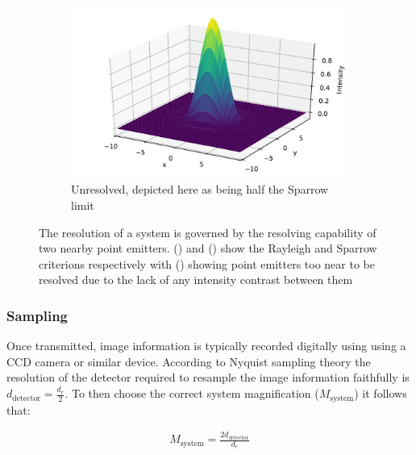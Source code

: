     \begin{figure}
    \ContinuedFloat
    \begin{subfigure}[b]{\textwidth}
        \includegraphics{+airy_too_close}
        \caption{Unresolved, depicted here as being half the Sparrow limit}
        \label{fig:airy_too_close}
    \end{subfigure}
    \caption{The resolution of a system is governed by the resolving capability of two nearby point emitters.
    () and () show the Rayleigh and Sparrow criterions respectively with () showing point emitters too near to be resolved due to the lack of any intensity contrast between them}
    \label{fig:airy_disk_resolution}
\end{figure}

%
%


\subsubsection{Sampling}

Once transmitted, image information is typically recorded digitally using using a CCD camera or similar device.
According to Nyquist sampling theory the resolution of the detector required to resample the image information faithfully is $d_\text{detector} = \frac{d_r}{2}$.
To then choose the correct system magnification ($M_\text{system}$) it follows that:

\begin{align}
    M_\text{system} = \frac{2d_\text{detector}}{d_r}
\end{align}

